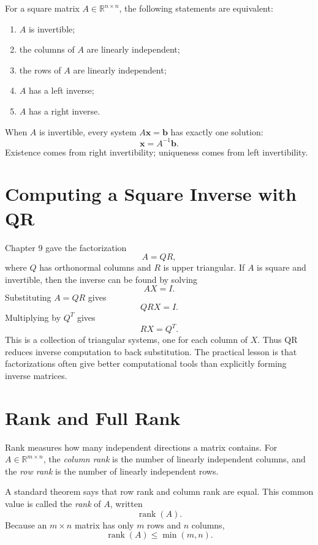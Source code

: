 For a square matrix \(A\in\mathbb{R}^{n\times n}\), the following statements are equivalent:
\begin{enumerate}
    \item \(A\) is invertible;
    \item the columns of \(A\) are linearly independent;
    \item the rows of \(A\) are linearly independent;
    \item \(A\) has a left inverse;
    \item \(A\) has a right inverse.
\end{enumerate}
When \(A\) is invertible, every system \(A\mathbf{x}=\mathbf{b}\) has exactly one solution:
\[
    \mathbf{x}=A^{-1}\mathbf{b}.
\]
Existence comes from right invertibility; uniqueness comes from left invertibility.

\section{Computing a Square Inverse with QR}
\label{mf:qr-square-inverse}
\label{mf:qr-inverse-computation}

Chapter 9 gave the factorization
\[
    A=QR,
\]
where \(Q\) has orthonormal columns and \(R\) is upper triangular. If \(A\) is square and invertible, then the inverse can be found by solving
\[
    AX=I.
\]
Substituting \(A=QR\) gives
\[
    QRX=I.
\]
Multiplying by \(Q^T\) gives
\[
    RX=Q^T.
\]
This is a collection of triangular systems, one for each column of \(X\). Thus QR reduces inverse computation to back substitution. The practical lesson is that factorizations often give better computational tools than explicitly forming inverse matrices.

\section{Rank and Full Rank}
\label{mf:rank}

Rank measures how many independent directions a matrix contains. For \(A\in\mathbb{R}^{m\times n}\), the \emph{column rank} is the number of linearly independent columns, and the \emph{row rank} is the number of linearly independent rows.
\label{mf:column-rank}
\label{mf:row-rank}

A standard theorem says that row rank and column rank are equal. This common value is called the \emph{rank} of \(A\), written
\[
    \operatorname{rank}(A).
\]
Because an \(m\times n\) matrix has only \(m\) rows and \(n\) columns,
\[
    \operatorname{rank}(A)\leq \min(m,n).
\]

